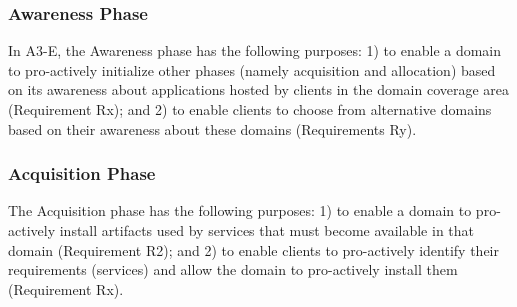 \subsubsection*{Awareness Phase}\label{sec:A3-E-awareness}


In A3-E, the Awareness phase has the following purposes: 1) to enable a domain to pro-actively initialize other phases (namely acquisition and allocation) based on its awareness about  applications hosted by clients in the domain coverage area (Requirement Rx); and 2) to enable clients to choose from alternative domains based on their awareness about these domains (Requirements Ry).


\subsubsection*{Acquisition Phase}\label{sec:A3-E-acquisition}

The Acquisition phase has the following purposes: 1) to enable a domain to pro-actively install artifacts used by services that must become available in that domain (Requirement R2); and 2) to enable clients to pro-actively identify their requirements (services) and allow the domain to pro-actively install them (Requirement Rx).

